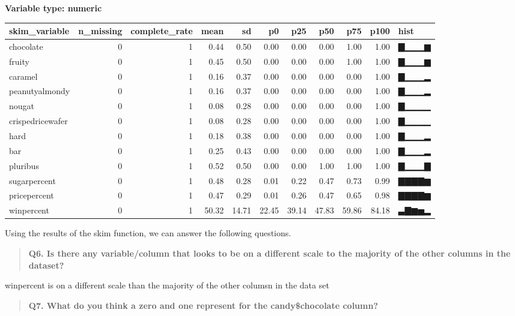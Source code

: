 \documentclass[
]{article}
\begin{document}
\textbf{Variable type: numeric}

\begin{longtable}[]{@{}lrrrrrrrrrl@{}}
\toprule
skim\_variable & n\_missing & complete\_rate & mean & sd & p0 & p25 &
p50 & p75 & p100 & hist \\
\midrule
\endhead
chocolate & 0 & 1 & 0.44 & 0.50 & 0.00 & 0.00 & 0.00 & 1.00 & 1.00 &
▇▁▁▁▆ \\
fruity & 0 & 1 & 0.45 & 0.50 & 0.00 & 0.00 & 0.00 & 1.00 & 1.00 &
▇▁▁▁▆ \\
caramel & 0 & 1 & 0.16 & 0.37 & 0.00 & 0.00 & 0.00 & 0.00 & 1.00 &
▇▁▁▁▂ \\
peanutyalmondy & 0 & 1 & 0.16 & 0.37 & 0.00 & 0.00 & 0.00 & 0.00 & 1.00
& ▇▁▁▁▂ \\
nougat & 0 & 1 & 0.08 & 0.28 & 0.00 & 0.00 & 0.00 & 0.00 & 1.00 &
▇▁▁▁▁ \\
crispedricewafer & 0 & 1 & 0.08 & 0.28 & 0.00 & 0.00 & 0.00 & 0.00 &
1.00 & ▇▁▁▁▁ \\
hard & 0 & 1 & 0.18 & 0.38 & 0.00 & 0.00 & 0.00 & 0.00 & 1.00 & ▇▁▁▁▂ \\
bar & 0 & 1 & 0.25 & 0.43 & 0.00 & 0.00 & 0.00 & 0.00 & 1.00 & ▇▁▁▁▂ \\
pluribus & 0 & 1 & 0.52 & 0.50 & 0.00 & 0.00 & 1.00 & 1.00 & 1.00 &
▇▁▁▁▇ \\
sugarpercent & 0 & 1 & 0.48 & 0.28 & 0.01 & 0.22 & 0.47 & 0.73 & 0.99 &
▇▇▇▇▆ \\
pricepercent & 0 & 1 & 0.47 & 0.29 & 0.01 & 0.26 & 0.47 & 0.65 & 0.98 &
▇▇▇▇▆ \\
winpercent & 0 & 1 & 50.32 & 14.71 & 22.45 & 39.14 & 47.83 & 59.86 &
84.18 & ▃▇▆▅▂ \\
\bottomrule
\end{longtable}

Using the results of the skim function, we can answer the following
questions.

\begin{quote}
\textbf{Q6. Is there any variable/column that looks to be on a different
scale to the majority of the other columns in the dataset?}
\end{quote}

winpercent is on a different scale than the majority of the other
columsn in the data set

\begin{quote}
\textbf{Q7. What do you think a zero and one represent for the
candy\$chocolate column?}
\end{quote}
\end{document}
